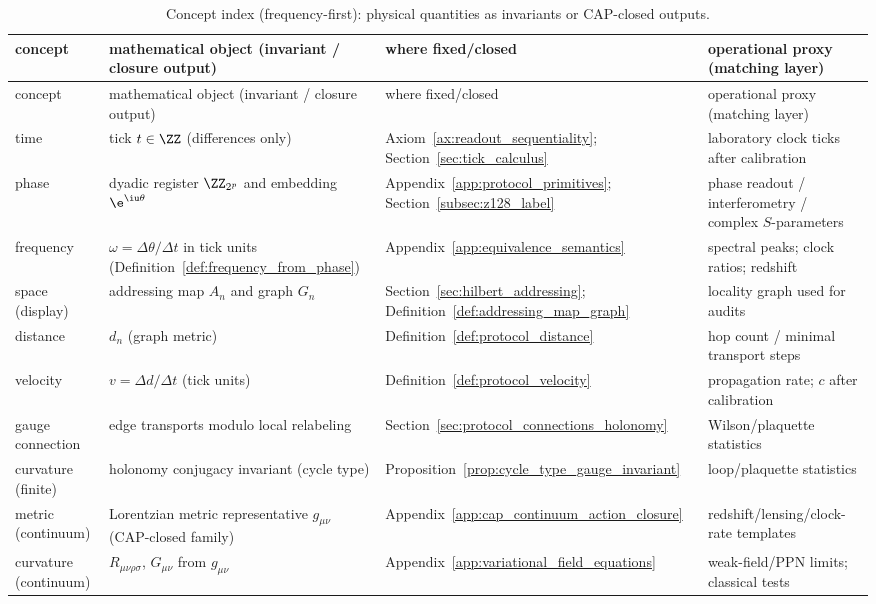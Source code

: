\begin{longtable}{p{} p{} p{} p{}}
\caption{Concept index (frequency-first): physical quantities as invariants or CAP-closed outputs.}
\label{tab:concept_index}\\
\toprule
concept & mathematical object (invariant / closure output) & where fixed/closed & operational proxy (matching layer) \\
\midrule
\endfirsthead
\toprule
concept & mathematical object (invariant / closure output) & where fixed/closed & operational proxy (matching layer) \\
\midrule
\endhead
time & tick $t\in\ZZ$ (differences only) & Axiom~\ref{ax:readout_sequentiality}; Section~\ref{sec:tick_calculus} & laboratory clock ticks after calibration \\
phase & dyadic register $\ZZ_{2^p}$ and embedding $\e^{\iu\theta}$ & Appendix~\ref{app:protocol_primitives}; Section~\ref{subsec:z128_label} & phase readout / interferometry / complex $S$-parameters \\
frequency & $\omega=\Delta\theta/\Delta t$ in tick units (Definition~\ref{def:frequency_from_phase}) & Appendix~\ref{app:equivalence_semantics} & spectral peaks; clock ratios; redshift \\
space (display) & addressing map $A_n$ and graph $G_n$ & Section~\ref{sec:hilbert_addressing}; Definition~\ref{def:addressing_map_graph} & locality graph used for audits \\
distance & $d_n$ (graph metric) & Definition~\ref{def:protocol_distance} & hop count / minimal transport steps \\
velocity & $v=\Delta d/\Delta t$ (tick units) & Definition~\ref{def:protocol_velocity} & propagation rate; $c$ after calibration \\
gauge connection & edge transports modulo local relabeling & Section~\ref{sec:protocol_connections_holonomy} & Wilson/plaquette statistics \\
curvature (finite) & holonomy conjugacy invariant (cycle type) & Proposition~\ref{prop:cycle_type_gauge_invariant} & loop/plaquette statistics \\
metric (continuum) & Lorentzian metric representative $g_{\mu\nu}$ (CAP-closed family) & Appendix~\ref{app:cap_continuum_action_closure} & redshift/lensing/clock-rate templates \\
curvature (continuum) & $R_{\mu\nu\rho\sigma}$, $G_{\mu\nu}$ from $g_{\mu\nu}$ & Appendix~\ref{app:variational_field_equations} & weak-field/PPN limits; classical tests \\

\end{longtable}
